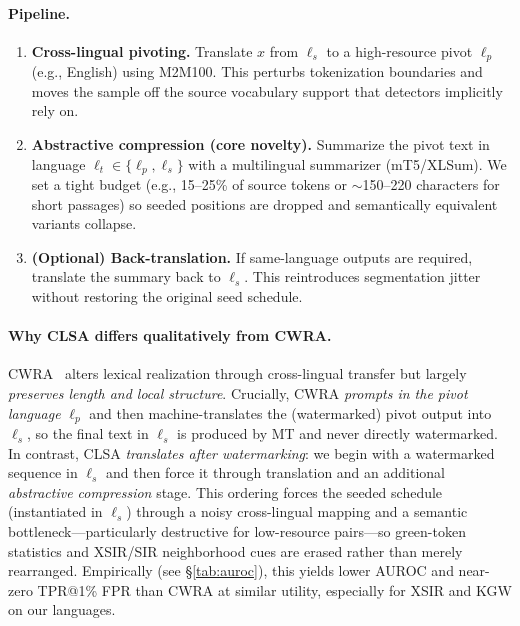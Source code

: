 \documentclass{article}
\begin{document}
\paragraph{Pipeline.}
\begin{enumerate}
    \item \textbf{Cross-lingual pivoting.} Translate $x$ from $\ell_s$ to a high-resource pivot $\ell_p$ (e.g., English) using M2M100. This perturbs tokenization boundaries and moves the sample off the source vocabulary support that detectors implicitly rely on.
    \item \textbf{Abstractive compression (core novelty).} Summarize the pivot text in language $\ell_t\!\in\!\{\ell_p,\ell_s\}$ with a multilingual summarizer (mT5/XLSum). We set a tight budget (e.g., 15--25\% of source tokens or $\sim$150--220 characters for short passages) so seeded positions are dropped and semantically equivalent variants collapse.
    \item \textbf{(Optional) Back-translation.} If same-language outputs are required, translate the summary back to $\ell_s$. This reintroduces segmentation jitter without restoring the original seed schedule.
\end{enumerate}

\paragraph{Why CLSA differs qualitatively from CWRA.}
CWRA~\citep{He2024cwra} alters lexical realization through cross-lingual transfer but largely \emph{preserves length and local structure}. Crucially, CWRA \emph{prompts in the pivot language} $\ell_p$ and then machine-translates the (watermarked) pivot output into $\ell_s$, so the final text in $\ell_s$ is produced by MT and never directly watermarked. In contrast, CLSA \emph{translates after watermarking}: we begin with a watermarked sequence in $\ell_s$ and then force it through translation and an additional \emph{abstractive compression} stage. This ordering forces the seeded schedule (instantiated in $\ell_s$) through a noisy cross-lingual mapping and a semantic bottleneck—particularly destructive for low-resource pairs—so green-token statistics and XSIR/SIR neighborhood cues are erased rather than merely rearranged. Empirically (see \S\ref{tab:auroc}), this yields lower AUROC and near-zero TPR@1\% FPR than CWRA at similar utility, especially for XSIR and KGW on our languages. 
\end{document}

